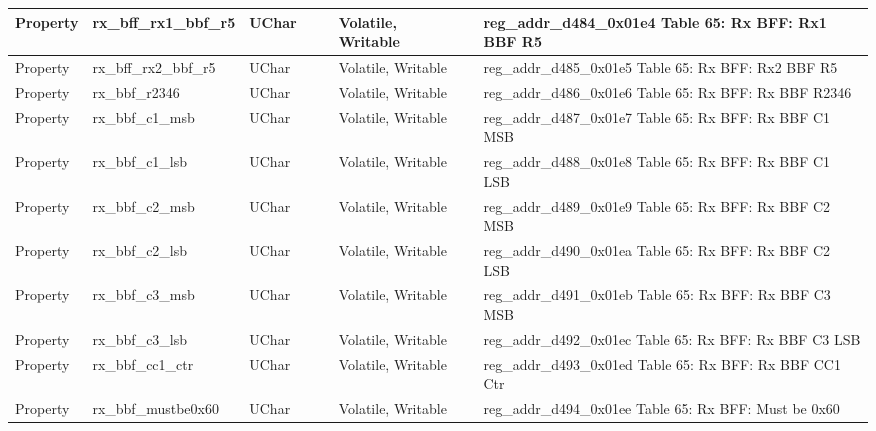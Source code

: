 \documentclass{article}
\begin{document}
\begin{scriptsize}
\begin{longtable}{|p{2cm}|p{5cm}|p{1cm}|p{2cm}|p{2cm}|p{1.75cm}|p{1.5cm}|p{5.1cm}|}
  \hline
  Property & rx\_bff\_rx1\_bbf\_r5                                    & UChar &                  &                  & Volatile,  Writable &         & reg\_addr\_d484\_0x01e4 Table 65: Rx BFF: Rx1 BBF R5 \\
  \hline
  Property & rx\_bff\_rx2\_bbf\_r5                                    & UChar &                  &                  & Volatile,  Writable &         & reg\_addr\_d485\_0x01e5 Table 65: Rx BFF: Rx2 BBF R5 \\
  \hline
  Property & rx\_bbf\_r2346                                           & UChar &                  &                  & Volatile,  Writable &         & reg\_addr\_d486\_0x01e6 Table 65: Rx BFF: Rx BBF R2346 \\
  \hline
  Property & rx\_bbf\_c1\_msb                                         & UChar &                  &                  & Volatile,  Writable &         & reg\_addr\_d487\_0x01e7 Table 65: Rx BFF: Rx BBF C1 MSB \\
  \hline
  Property & rx\_bbf\_c1\_lsb                                         & UChar &                  &                  & Volatile,  Writable &         & reg\_addr\_d488\_0x01e8 Table 65: Rx BFF: Rx BBF C1 LSB \\
  \hline
  Property & rx\_bbf\_c2\_msb                                         & UChar &                  &                  & Volatile,  Writable &         & reg\_addr\_d489\_0x01e9 Table 65: Rx BFF: Rx BBF C2 MSB \\
  \hline
  Property & rx\_bbf\_c2\_lsb                                         & UChar &                  &                  & Volatile,  Writable &         & reg\_addr\_d490\_0x01ea Table 65: Rx BFF: Rx BBF C2 LSB \\
  \hline
  Property & rx\_bbf\_c3\_msb                                         & UChar &                  &                  & Volatile,  Writable &         & reg\_addr\_d491\_0x01eb Table 65: Rx BFF: Rx BBF C3 MSB \\
  \hline
  Property & rx\_bbf\_c3\_lsb                                         & UChar &                  &                  & Volatile,  Writable &         & reg\_addr\_d492\_0x01ec Table 65: Rx BFF: Rx BBF C3 LSB \\
  \hline
  Property & rx\_bbf\_cc1\_ctr                                        & UChar &                  &                  & Volatile,  Writable &         & reg\_addr\_d493\_0x01ed Table 65: Rx BFF: Rx BBF CC1 Ctr \\
  \hline
  Property & rx\_bbf\_mustbe0x60                                      & UChar &                  &                  & Volatile,  Writable &         & reg\_addr\_d494\_0x01ee Table 65: Rx BFF: Must be 0x60 \\

\end{longtable}
\end{scriptsize}
\end{document}
